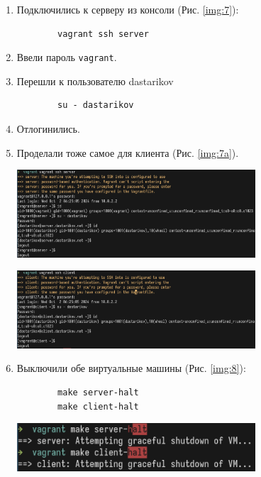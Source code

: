 \begin{enumerate}
\begin{center}
        \label{img:6}
    \end{center}
    \item Подключились к серверу из консоли (Рис. \ref{img:7}):
        \begin{verbatim}
        vagrant ssh server
        \end{verbatim}
    \item Ввели пароль \texttt{vagrant}.
    \item Перешли к пользователю dastarikov
        \begin{verbatim}
        su - dastarikov
        \end{verbatim}
    \item Отлогинились.
    \item Проделали тоже самое для клиента (Рис. \ref{img:7a}).
    \begin{center}
        \centering
        \includegraphics[width=0.7\textwidth]{../images/img7.png}
        \label{img:7}
    \end{center}
    \begin{center}
        \centering
        \includegraphics[width=0.7\textwidth]{../images/img7a.png}
        \label{img:7a}
    \end{center}
    \item Выключили обе виртуальные машины (Рис. \ref{img:8}):
        \begin{verbatim}
        make server-halt
        make client-halt
        \end{verbatim}
    \begin{center}
        \centering
        \includegraphics[width=0.7\textwidth]{../images/img8.png}

\end{center}
\end{enumerate}
